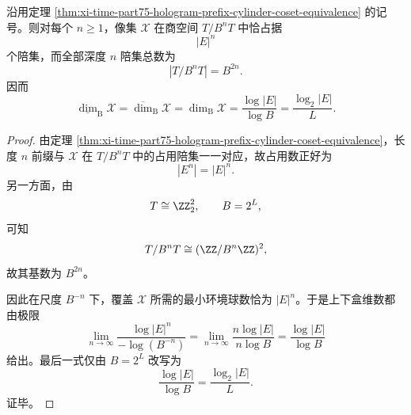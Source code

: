 \begin{corollary}[全息地址像集的商占用计数与精确盒维数]\label{cor:xi-time-part75-hologram-image-quotient-box-dimension}
沿用定理 \ref{thm:xi-time-part75-hologram-prefix-cylinder-coset-equivalence} 的记号。则对每个 \(n\ge 1\)，像集 \(\mathcal X\) 在商空间 \(T/B^nT\) 中恰占据
\[
|E|^n
\]
个陪集，而全部深度 \(n\) 陪集总数为
\[
|T/B^nT|=B^{2n}.
\]
因而
\[
\underline{\dim}_{\mathrm B}\mathcal X
=
\overline{\dim}_{\mathrm B}\mathcal X
=
\dim_{\mathrm B}\mathcal X
=
\frac{\log |E|}{\log B}
=
\frac{\log_2|E|}{L}.
\]
\end{corollary}
\begin{proof}
由定理 \ref{thm:xi-time-part75-hologram-prefix-cylinder-coset-equivalence}，长度 \(n\) 前缀与 \(\mathcal X\) 在 \(T/B^nT\) 中的占用陪集一一对应，故占用数正好为
\[
|E^n|=|E|^n.
\]
另一方面，由
\[
T\cong \ZZ_2^2,
\qquad
B=2^L,
\]
可知
\[
T/B^nT\cong (\ZZ/B^n\ZZ)^2,
\]
故其基数为 \(B^{2n}\)。

因此在尺度 \(B^{-n}\) 下，覆盖 \(\mathcal X\) 所需的最小环境球数恰为 \(|E|^n\)。于是上下盒维数都由极限
\[
\lim_{n\to\infty}\frac{\log |E|^n}{-\log(B^{-n})}
=
\lim_{n\to\infty}\frac{n\log|E|}{n\log B}
=
\frac{\log|E|}{\log B}
\]
给出。最后一式仅由 \(B=2^L\) 改写为
\[
\frac{\log|E|}{\log B}=\frac{\log_2|E|}{L}.
\]
证毕。
\end{proof}

